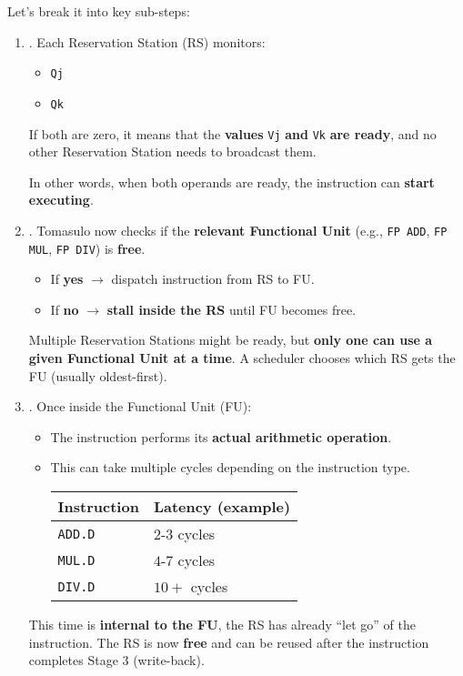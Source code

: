 \highspace
Let's break it into key sub-steps:
\begin{enumerate}
    \item {}. Each Reservation Station (RS) monitors:
    \begin{itemize}
        \item \texttt{Qj}
        \item \texttt{Qk}
    \end{itemize}
    If both are zero, it means that the \textbf{values} \texttt{Vj} \textbf{and} \texttt{Vk} \textbf{are ready}, and no other Reservation Station needs to broadcast them.

    \textcolor{Green3}{} In other words, when both operands are ready, the instruction can \textbf{start executing}.


    \item {}. Tomasulo now checks if the \textbf{relevant Functional Unit} (e.g., \texttt{FP ADD}, \texttt{FP MUL}, \texttt{FP DIV}) is \textbf{free}.
    \begin{itemize}
        \item[\textcolor{Green3}{\faIcon{check-circle}}] If \textcolor{Green3}{\textbf{yes}} $\rightarrow$ dispatch instruction from RS to FU.
        \item[\textcolor{Red2}{\faIcon{times-circle}}] If \textcolor{Red2}{\textbf{no}} $\rightarrow$ \textbf{stall inside the RS} until FU becomes free.
    \end{itemize}
    Multiple Reservation Stations might be ready, but \textbf{only one can use a given Functional Unit at a time}. A scheduler chooses which RS gets the FU (usually oldest-first).

    
    \item {}. Once inside the Functional Unit (FU):
    \begin{itemize}
        \item The instruction performs its \textbf{actual arithmetic operation}.
        \item This can take multiple cycles depending on the instruction type.
        \begin{table}[!htp]
            \centering
            \begin{tabular}{@{} l l @{}}
                \toprule
                Instruction & Latency (example) \\
                \midrule
                \texttt{ADD.D} & $2$-$3$ cycles \\ [.3em]
                \texttt{MUL.D} & $4$-$7$ cycles \\ [.3em]
                \texttt{DIV.D} & $10+$ cycles \\
                \bottomrule
            \end{tabular}
        \end{table}
    \end{itemize}
    This time is \textbf{internal to the FU}, the RS has already ``let go'' of the instruction. The RS is now \textbf{free} and can be reused after the instruction completes Stage 3 (write-back).


\end{enumerate}
